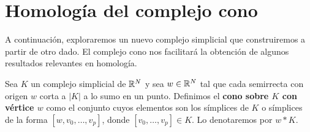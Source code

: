 %
%
%
%
%
%
%

\section{Homología del complejo cono}
A continuación, exploraremos un nuevo complejo simplicial que construiremos a partir
de otro dado. El complejo cono nos facilitará la obtención de algunos resultados
relevantes en homología.
\begin{definicion}
	Sea $K$ un complejo simplicial de $\mathbb{R}^{N}$ y sea $w \in \mathbb{R}^{N}$ tal que cada semirrecta
	con origen $w$ corta a $|K|$ a lo sumo en un punto. Definimos el \textbf{cono
		sobre $K$ con vértice $w$} como el conjunto cuyos elementos son los símplices de
	$K$ o símplices de la forma $[w,v_{0},\ldots,v_{p}]$, donde
	$[v_{0}, \ldots, v_{p}] \in K$. Lo denotaremos por $w \ast K$.
\end{definicion}

